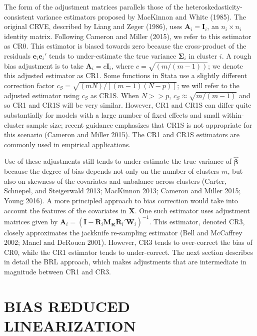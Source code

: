 \documentclass[12pt]{article}
\begin{document}
The form of the adjustment matrices parallels those of the
heteroskedasticity-consistent variance estimators proposed by MacKinnon
and White (1985). The original CRVE, described by Liang and Zeger
(1986), uses \(\mathbf{A}_i = \mathbf{I}_i\), an \(n_i \times n_i\)
identity matrix. Following Cameron and Miller (2015), we refer to this
estimator as CR0. This estimator is biased towards zero because the
cross-product of the residuals \(\mathbf{e}_i \mathbf{e}_i'\) tends to
under-estimate the true variance \(\boldsymbol\Sigma_i\) in cluster
\(i\). A rough bias adjustment is to take
\(\mathbf{A}_i = c\mathbf{I}_i\), where \(c = \sqrt{(m/(m-1))}\); we
denote this adjusted estimator as CR1. Some functions in Stata use a
slightly different correction factor
\(c_S = \sqrt{(m N)/[(m - 1)(N - p)]}\); we will refer to the adjusted
estimator using \(c_S\) as CR1S. When \(N >> p\),
\(c_S \approx \sqrt{m/(m-1)}\) and so CR1 and CR1S will be very similar.
However, CR1 and CR1S can differ quite substantially for models with a
large number of fixed effects and small within-cluster sample size;
recent guidance emphasizes that CR1S is not appropriate for this
scenario (Cameron and Miller 2015). The CR1 and CR1S estimators are
commonly used in empirical applications.

Use of these adjustments still tends to under-estimate the true variance
of \(\hat{\boldsymbol\beta}\) because the degree of bias depends not
only on the number of clusters \(m\), but also on skewness of the
covariates and unbalance across clusters (Carter, Schnepel, and
Steigerwald 2013; MacKinnon 2013; Cameron and Miller 2015; Young 2016).
A more principled approach to bias correction would take into account
the features of the covariates in \(\mathbf{X}\). One such estimator
uses adjustment matrices given by
\(\mathbf{A}_i = \left(\mathbf{I} - \mathbf{\ddot{R}}_i \mathbf{M_{\ddot{R}}}\mathbf{\ddot{R}}_i'\mathbf{W}_i\right)^{-1}\).
This estimator, denoted CR3, closely approximates the jackknife
re-sampling estimator (Bell and McCaffrey 2002; Mancl and DeRouen 2001).
However, CR3 tends to over-correct the bias of CR0, while the CR1
estimator tends to under-correct. The next section describes in detail
the BRL approach, which makes adjustments that are intermediate in
magnitude between CR1 and CR3.

\hypertarget{sec:BRL}{%
\section{BIAS REDUCED LINEARIZATION}\label{sec:BRL}}
\end{document}
